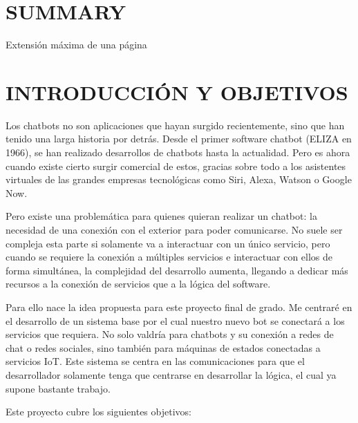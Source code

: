 \documentclass[spanish,12pt, a4paper, twoside]{paper}
\let\oldsection\section
\def\section{\cleardoublepage\oldsection}
\begin{document}
\section*{SUMMARY}
Extensión máxima de una página


\tableofcontents %



\listoffigures
\listoftables



\newpage
{} 

\section{INTRODUCCIÓN Y OBJETIVOS}

Los chatbots no son aplicaciones que hayan surgido recientemente, sino que han tenido una larga historia por detrás. Desde el primer software chatbot (ELIZA en 1966), se han realizado desarrollos de chatbots hasta la actualidad. Pero es ahora cuando existe cierto surgir comercial de estos, gracias sobre todo a los asistentes virtuales de las grandes empresas tecnológicas como Siri, Alexa, Watson o Google Now.
\newline

Pero existe una problemática para quienes quieran realizar un chatbot: la necesidad de una conexión con el exterior para poder comunicarse. No suele ser compleja esta parte si solamente va a interactuar con un único servicio, pero cuando se requiere la conexión a múltiples servicios e interactuar con ellos de forma simultánea, la complejidad del desarrollo aumenta, llegando a dedicar más recursos a la conexión de servicios que a la lógica del software.
\newline

Para ello nace la idea propuesta para este proyecto final de grado. Me centraré en el desarrollo de un sistema base por el cual nuestro nuevo bot se conectará a los servicios que requiera. No solo valdría para chatbots y su conexión a redes de chat o redes sociales, sino también para máquinas de estados conectadas a servicios IoT. Este sistema se centra en las comunicaciones para que el desarrollador solamente tenga que centrarse en desarrollar la lógica, el cual ya supone bastante trabajo.
\newline

Este proyecto cubre los siguientes objetivos:
\end{document}
